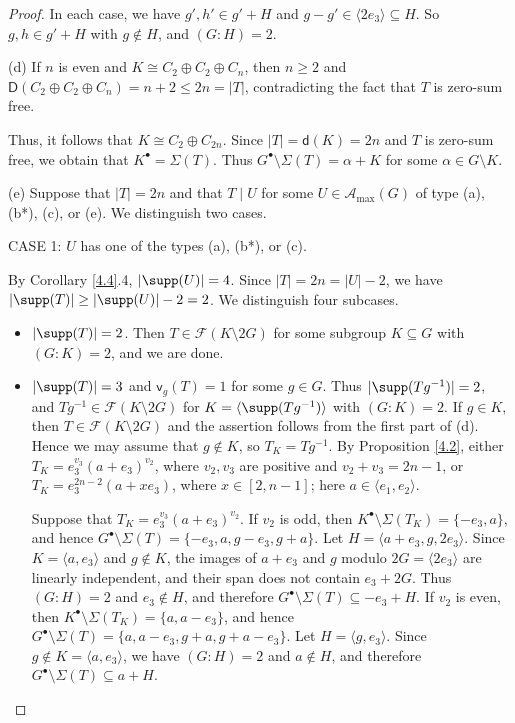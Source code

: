 \documentclass[a4paper, 10pt]{amsart}
\theoremstyle{plain}
\theoremstyle{definition}
\numberwithin{equation}{section}
\begin{document}
{\begin{proof}
	In each case, we have $g',h'\in g'+ H$ and $g-g'\in \langle 2e_3 \rangle\subseteq H$. So $g,h\in g'+ H$ with $g\notin H$, and $(G:H)=2$.
	
	(d) If $n$ is even and $K\cong C_2 \oplus C_2 \oplus C_{n}$, then $n\ge 2$ and $\mathsf{D}(C_2 \oplus C_2 \oplus C_{n})=n+2\le 2n =|T|$, contradicting the fact that $T$ is zero-sum free.
	
	Thus, it follows that $K\cong C_2 \oplus C_{2n}$. Since $|T|=\mathsf{d}(K)=2n$ and $T$ is zero-sum free, we obtain that $K^{\bullet}= \Sigma (T)$. Thus $G^{\bullet}\setminus \Sigma (T)=\alpha+K$ for some $\alpha \in G \setminus K$.
	
\smallskip
(e) Suppose that $|T|=2n$ and that $T\mid U$ for some $U\in\mathcal A_{\max}(G)$ of type (a), (b*), (c), or (e). We distinguish two cases.
	
	\smallskip
	\noindent
	CASE 1: $U$ has one of the types (a), (b*), or (c).
	
By Corollary \ref{4.4}.4, $|\supp(U)|=4$. Since $|T|=2n=|U|-2$, we have $|\supp(T)|\ge |\supp(U)|-2=2$. We distinguish four subcases.
	\begin{itemize}
		\item[(i)] $|\supp(T)|=2$. Then $T \in \mathcal F (K\setminus 2G)$ for some subgroup $K \subseteq G$ with $(G \colon K)=2$, and we are done.
		
		\item[(ii)] $|\supp(T)|=3$ and $\mathsf{v}_g(T)=1$ for some $g\in G$. Thus $|\supp(Tg^{-1})|=2$, and $Tg^{-1}\in\mathcal F(K\setminus 2G)$ for $K=\langle\supp(Tg^{-1})\rangle$ with $(G\colon K)=2$. If $g\in K$, then $T\in\mathcal F(K\setminus 2G)$ and the assertion follows from the first part of (d). Hence we may assume that $g\notin K$, so $T_K=Tg^{-1}$. By Proposition \ref{4.2}, either $T_K=e_3^{v_3}(a+e_3)^{v_2}$, where $v_2,v_3$ are positive and $v_2+v_3=2n-1$, or $T_K=e_3^{2n-2}(a+xe_3)$, where $x\in[2,n-1]$; here $a\in\langle e_1,e_2\rangle$.
		
		
		
		Suppose that $T_K=e_3^{v_3}(a+e_3)^{v_2}$. If $v_2$ is odd, then $K^{\bullet}\setminus\Sigma(T_K)=\{-e_3,a\}$, and hence $G^{\bullet}\setminus\Sigma(T)=\{-e_3,a,g-e_3,g+a\}$. Let $H=\langle a+e_3,g,2e_3\rangle$. Since $K=\langle a,e_3\rangle$ and $g\notin K$, the images of $a+e_3$ and $g$ modulo $2G=\langle2e_3\rangle$ are linearly independent, and their span does not contain $e_3+2G$. Thus $(G\colon H)=2$ and $e_3\notin H$, and therefore $G^{\bullet}\setminus\Sigma(T)\subseteq-e_3+H$. If $v_2$ is even, then $K^{\bullet}\setminus\Sigma(T_K)=\{a,a-e_3\}$, and hence $G^{\bullet}\setminus\Sigma(T)=\{a,a-e_3,g+a,g+a-e_3\}$. Let $H=\langle g,e_3\rangle$. Since $g\notin K=\langle a,e_3\rangle$, we have $(G\colon H)=2$ and $a\notin H$, and therefore $G^{\bullet}\setminus\Sigma(T)\subseteq a+H$.
		

\end{itemize}
\end{proof}}
\end{document}
